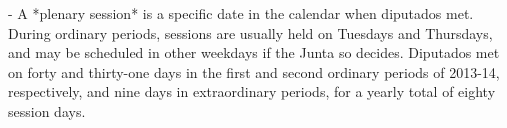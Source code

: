 \documentclass[letter,12pt]{article}
\begin{document}
- A *plenary session* is a specific date in the calendar when diputados met. During ordinary periods, sessions are usually held on Tuesdays and Thursdays, and may be scheduled in other weekdays if the Junta so decides. Diputados met on forty and thirty-one days in the first and second ordinary periods of 2013-14, respectively, and nine days in extraordinary periods, for a yearly total of eighty session days.



                                                                                                                                  
                                                                                                                                  
                                                                                                                                  
\end{document}
